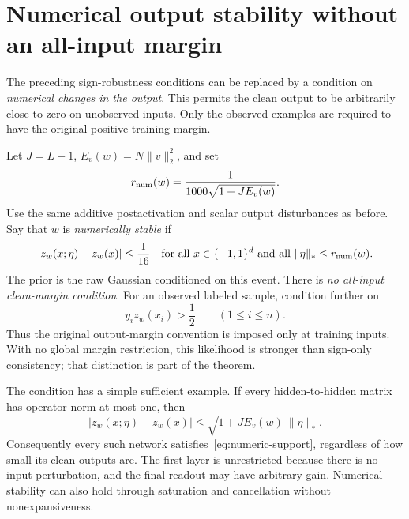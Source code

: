 \section{Numerical output stability without an all-input margin}
\label{sec:numerical-stability}

The preceding sign-robustness conditions can be replaced by a condition on
\emph{numerical changes in the output}. This permits the clean output to be
arbitrarily close to zero on unobserved inputs. Only the observed examples
are required to have the original positive training margin.

Let $J=L-1$, $E_v(w)=N\|v\|_2^2$, and set
\begin{equation}\label{eq:numeric-radius}
 r_{\rm num}(w)=\frac{1}{1000\sqrt{1+J E_v(w)}}.
\end{equation}
Use the same additive postactivation and scalar output disturbances as
before. Say that $w$ is \emph{numerically stable} if
\begin{equation}\label{eq:numeric-support}
 |z_w(x;\eta)-z_w(x)|\le\frac1{16}
 \quad\text{for all }x\in\{-1,1\}^d
 \text{ and all }\|\eta\|_*\le r_{\rm num}(w).
\end{equation}
The prior is the raw Gaussian conditioned on this event. There is
\emph{no all-input clean-margin condition}. For an observed labeled sample,
condition further on
\begin{equation}\label{eq:numeric-likelihood}
 y_i z_w(x_i)>\frac12\qquad(1\le i\le n).
\end{equation}
Thus the original output-margin convention is imposed only at training
inputs. With no global margin restriction, this likelihood is stronger
than sign-only consistency; that distinction is part of the theorem.

The condition has a simple sufficient example. If every hidden-to-hidden
matrix has operator norm at most one, then
\[
 |z_w(x;\eta)-z_w(x)|
 \le\sqrt{1+J E_v(w)}\,\|\eta\|_*.
\]
Consequently every such network satisfies~\eqref{eq:numeric-support},
regardless of how small its clean outputs are. The first layer is
unrestricted because there is no input perturbation, and the final readout
may have arbitrary gain. Numerical stability can also hold through
saturation and cancellation without nonexpansiveness.

